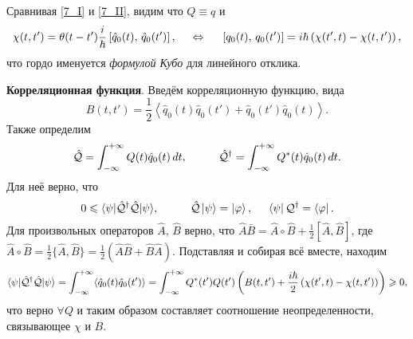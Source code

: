 Сравнивая \eqref{7_I} и \eqref{7_II}, видим что $Q \equiv q$ и
\begin{equation}
	\chi(t, t') = \theta(t-t') \frac{i}{\hbar} \left[
		\hat{q}_0 (t),\,  \hat{q}_0(t')
	\right],
	\hspace{5 mm} 
	\Leftrightarrow
	\hspace{5 mm} 
	\left[q_0 (t),\, q_0 (t')\right] = i \hbar \left(
		\chi(t', t) - \chi(t, t')
	\right),
\end{equation}
что гордо именуется \textit{формулой Кубо} для линейного отклика. 

\textbf{Корреляционная функция}. Введём корреляционную функцию, вида
\begin{equation*}
	B(t, t') = \frac{1}{2}\left\langle 
		\hat{q}_0(t) \hat{q}_0(t') + \hat{q}_0 (t') \hat{q}_0 (t)
	\right\rangle.
\end{equation*}
Также определим
\begin{equation*}
	\hat{\Q} = \int_{-\infty}^{+\infty} Q(t) \hat{q}_0 (t)  \d t,
	\hspace{10 mm} 
	\hat{\Q}\con = \int_{-\infty}^{+\infty} Q^*(t) \hat{q}_0 (t) \d t.
\end{equation*}
Для неё верно, что
\begin{equation*}
	0 \leq \bk{\psi}[\hat{\Q}\con \hat{\Q}]{\psi},
	\hspace{10 mm} 
	\hat{\Q} \ket{\psi} = \ket{\varphi},
	\hspace{5 mm} 
	\bra{\psi} \Q\con = \bra{\varphi}.
\end{equation*}
Для произвольных операторов $\hat{A},\, \hat{B}$ верно, что $\hat{A} \bar{B} = \hat{A} \circ \hat{B} + \frac{1}{2} \left[\hat{A}, \hat{B}\right]$, где $\hat{A} \circ \hat{B} = 
\frac{1}{2}\{\hat{A}, \hat{B}\} = \frac{1}{2}\left(
		\hat{A} \hat{B} + \hat{B} \hat{A}
\right)$. Подставляя и собирая всё вместе,
 находим
 \begin{equation*}
 	\bk{\psi}[\hat{\Q}\con \hat{\Q}]{\psi} = \int_{-\infty}^{+\infty} \langle \hat{q}_0 (t) \hat{q}_0 (t') \rangle =  \int_{-\infty}^{+\infty} Q^* (t') Q(t') \left(
 		B(t, t') + \frac{i\hbar}{2} \left(\chi(t', t) - \chi(t, t')\right)
 	\right) \geq 0,
 \end{equation*}
 что верно $\forall Q$ и таким образом составляет соотношение неопределенности, связывающее $\chi$ и $B$.

